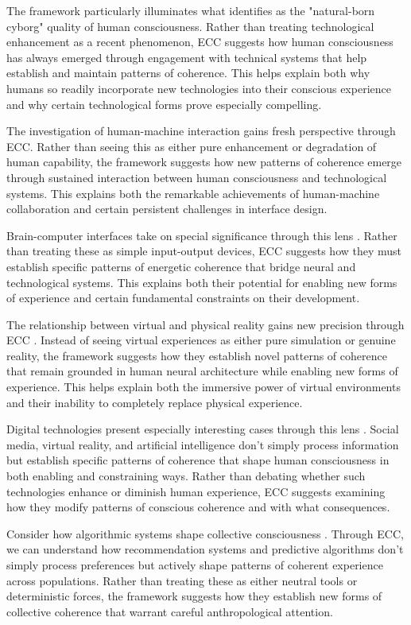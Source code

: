 The framework particularly illuminates what \cite{clark2003natural} identifies as the "natural-born cyborg" quality of human consciousness. Rather than treating technological enhancement as a recent phenomenon, ECC suggests how human consciousness has always emerged through engagement with technical systems that help establish and maintain patterns of coherence. This helps explain both why humans so readily incorporate new technologies into their conscious experience and why certain technological forms prove especially compelling.

The investigation of human-machine interaction \cite{mindell2015our} gains fresh perspective through ECC. Rather than seeing this as either pure enhancement or degradation of human capability, the framework suggests how new patterns of coherence emerge through sustained interaction between human consciousness and technological systems. This explains both the remarkable achievements of human-machine collaboration and certain persistent challenges in interface design.

Brain-computer interfaces take on special significance through this lens \cite{clark2003natural}. Rather than treating these as simple input-output devices, ECC suggests how they must establish specific patterns of energetic coherence that bridge neural and technological systems. This explains both their potential for enabling new forms of experience and certain fundamental constraints on their development.

The relationship between virtual and physical reality gains new precision through ECC \cite{turkle2011alone}. Instead of seeing virtual experiences as either pure simulation or genuine reality, the framework suggests how they establish novel patterns of coherence that remain grounded in human neural architecture while enabling new forms of experience. This helps explain both the immersive power of virtual environments and their inability to completely replace physical experience.

Digital technologies present especially interesting cases through this lens \cite{hayles2012how}. Social media, virtual reality, and artificial intelligence don't simply process information but establish specific patterns of coherence that shape human consciousness in both enabling and constraining ways. Rather than debating whether such technologies enhance or diminish human experience, ECC suggests examining how they modify patterns of conscious coherence and with what consequences.

Consider how algorithmic systems shape collective consciousness \cite{noble2018algorithms}. Through ECC, we can understand how recommendation systems and predictive algorithms don't simply process preferences but actively shape patterns of coherent experience across populations. Rather than treating these as either neutral tools or deterministic forces, the framework suggests how they establish new forms of collective coherence that warrant careful anthropological attention.

